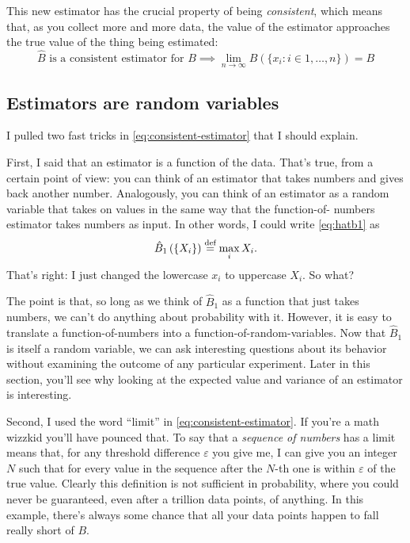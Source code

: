 This new estimator has the crucial property of being \emph{consistent}, which
means that, as you collect more and more data, the value of the estimator
approaches the true value of the thing being estimated:
\begin{equation}\label{eq:consistent-estimator}
\text{$\hat{B}$ is a consistent estimator for $B$}
  \implies \lim_{n\to\infty} \hat{B}(\{x_i : i \in 1,\ldots,n\}) = B
\end{equation}

\subsection{Estimators are random variables}

I pulled two fast tricks in \eqref{eq:consistent-estimator} that I should explain.

First, I said that an estimator is a function of the data. That's true, from a
certain point of view: you can think of an estimator that takes numbers and
gives back another number. Analogously, you can think of an estimator as a
random variable that takes on values in the same way that the function-of-
numbers estimator takes numbers as input. In other words, I could write \eqref{eq:hatb1}
as
\begin{equation}
\hat{B}_1\left( \{X_i\} \right) \stackrel{\text{def}}{=} \max_i X_i.
\end{equation}
That's right: I just changed the lowercase $x_i$ to uppercase $X_i$. So what?

The point is that, so long as we think of $\hat{B}_1$ as a function that just
takes numbers, we can't do anything about probability with it. However, it is
easy to translate a function-of-numbers into a function-of-random-variables.
Now that $\hat{B}_1$ is itself a random variable, we can ask interesting questions
about its behavior without examining the outcome of any particular experiment.
Later in this section, you'll see why looking at the expected value and variance
of an estimator is interesting.

Second, I used the word ``limit'' in \eqref{eq:consistent-estimator}.
If you're a math wizzkid you'll have pounced that. To say that
a \emph{sequence of numbers} has a limit means that, for any threshold difference
$\varepsilon$ you give me, I can give you an integer $N$ such that for every value
in the sequence after the $N$-th one is within $\varepsilon$ of the true value.
Clearly this definition is not sufficient in probability, where you could never
be guaranteed, even after a trillion data points, of anything.
In this example, there's always some
chance that all your data points happen to fall really short of $B$.

